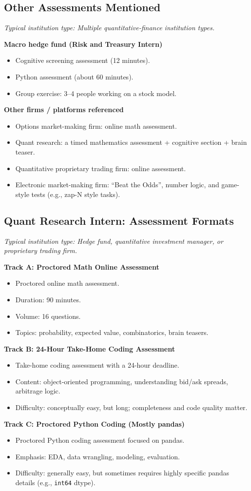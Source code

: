 \documentclass[11pt,letterpaper,openany]{book}
\newcommand{\RoleProfile}[2]{%
  \subsection{#1}%
  \noindent\textit{Typical institution type: #2.}\par
}
\begin{document}
\RoleProfile{Other Assessments Mentioned}{Multiple quantitative-finance institution types}
\textbf{Macro hedge fund (Risk and Treasury Intern)}
\begin{itemize}
  \item Cognitive screening assessment (12 minutes).
  \item Python assessment (about 60 minutes).
  \item Group exercise: 3--4 people working on a stock model.
\end{itemize}

\textbf{Other firms / platforms referenced}
\begin{itemize}
  \item Options market-making firm: online math assessment.
  \item Quant research: a timed mathematics assessment + cognitive section + brain teaser.
  \item Quantitative proprietary trading firm: online assessment.
  \item Electronic market-making firm: ``Beat the Odds'', number logic, and game-style tests (e.g., zap-N style tasks).
\end{itemize}

\RoleProfile{Quant Research Intern: Assessment Formats}{Hedge fund, quantitative investment manager, or proprietary trading firm}
\textbf{Track A: Proctored Math Online Assessment}
\begin{itemize}
  \item Proctored online math assessment.
  \item Duration: 90 minutes.
  \item Volume: 16 questions.
  \item Topics: probability, expected value, combinatorics, brain teasers.
\end{itemize}

\textbf{Track B: 24-Hour Take-Home Coding Assessment}
\begin{itemize}
  \item Take-home coding assessment with a 24-hour deadline.
  \item Content: object-oriented programming, understanding bid/ask spreads, arbitrage logic.
  \item Difficulty: conceptually easy, but long; completeness and code quality matter.
\end{itemize}

\textbf{Track C: Proctored Python Coding (Mostly pandas)}
\begin{itemize}
  \item Proctored Python coding assessment focused on pandas.
  \item Emphasis: EDA, data wrangling, modeling, evaluation.
  \item Difficulty: generally easy, but sometimes requires highly specific pandas details (e.g., \texttt{int64} dtype).
\end{itemize}
\end{document}
